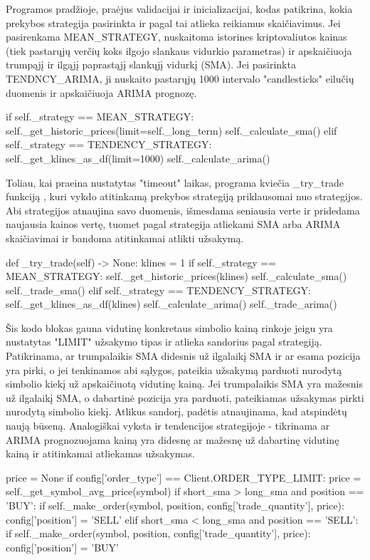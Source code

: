 \documentclass{VUMIFInfKursinis}
\begin{document}
Programos pradžioje, praėjus validacijai ir inicializacijai, kodas patikrina, kokia prekybos strategija pasirinkta ir pagal tai atlieka reikiamus skaičiavimus. Jei pasirenkama MEAN\_STRATEGY, nuskaitoma istorines kriptovaliutos kainas (tiek pastarųjų verčių koks ilgojo slankaus vidurkio parametras) ir apskaičiuoja trumpąjį ir ilgąjį paprastąjį slankųjį vidurkį (SMA). Jei pasirinkta TENDNCY\_ARIMA, ji nuskaito pastarųjų 1000 intervalo "candlesticks" eilučių duomenis ir apskaičiuoja ARIMA prognozę.
\begin{python}
if self._strategy == MEAN_STRATEGY:
    self._get_historic_prices(limit=self._long_term)
    self._calculate_sma()
elif self._strategy == TENDENCY_STRATEGY:
    self._get_klines_as_df(limit=1000)
    self._calculate_arima()
\end{python}

Toliau, kai praeina nustatytas "timeout" laikas, programa kviečia \_try\_trade funkciją , kuri vykdo atitinkamą prekybos strategiją priklausomai nuo strategijos. Abi strategijos atnaujina savo duomenis, išmesdama seniausia verte ir pridedama
naujausia kainos vertę, tuomet pagal strategija atliekami SMA arba ARIMA skaičiavimai ir bandoma atitinkamai atlikti 
užsakymą.

\begin{python}
def _try_trade(self) -> None:
	klines = 1
	if self._strategy == MEAN_STRATEGY:
		self._get_historic_prices(klines)
		self._calculate_sma()
		self._trade_sma()
	elif self._strategy == TENDENCY_STRATEGY:
		self._get_klines_as_df(klines)
		self._calculate_arima()
		self._trade_arima()
\end{python}

Šis kodo blokas gauna vidutinę konkretaus simbolio kainą rinkoje jeigu yra nustatytas "LIMIT" užsakymo tipas ir atlieka sandorius pagal strategiją. Patikrinama, ar trumpalaikis SMA didesnis už ilgalaikį SMA ir ar esama pozicija yra pirki, o jei tenkinamos abi sąlygos, pateikia užsakymą parduoti nurodytą simbolio kiekį už apskaičiuotą vidutinę kainą. Jei trumpalaikis SMA yra mažesnis už ilgalaikį SMA, o dabartinė pozicija yra parduoti, pateikiamas užsakymas pirkti nurodytą simbolio kiekį. Atlikus sandorį, padėtis atnaujinama, kad atspindėtų naują būseną. Analogiškai vyksta ir tendencijos strategijoje - tikrinama ar ARIMA prognozuojama kainą yra didesnę ar mažesnę už dabartinę vidutinę kainą ir atitinkamai atliekamas užsakymas.

\begin{python}
    price = None
    if config['order_type'] == Client.ORDER_TYPE_LIMIT:
        price = self._get_symbol_avg_price(symbol)
    if short_sma > long_sma and position == 'BUY':
        if self._make_order(symbol, position, config['trade_quantity'], price):
            config['position'] = 'SELL'
    elif short_sma < long_sma and position == 'SELL':
        if self._make_order(symbol, position, config['trade_quantity'], price):
            config['position'] = 'BUY'
\end{python}
\end{document}
